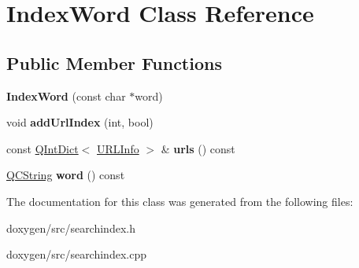 \hypertarget{class_index_word}{}\section{Index\+Word Class Reference}
\label{class_index_word}
\subsection*{Public Member Functions}
\begin{DoxyCompactItemize}
\item 
\mbox{\label{class_index_word_aebc5fc97bb87b053809703919508c765}} 
{\bfseries Index\+Word} (const char $\ast$word)
\item 
\mbox{\label{class_index_word_a16031b22d97aba33250595882a192b65}} 
void {\bfseries add\+Url\+Index} (int, bool)
\item 
\mbox{\label{class_index_word_a5643dbfdd1bffd26f5bb99ebb0019000}} 
const \mbox{\hyperlink{class_q_int_dict}{Q\+Int\+Dict}}$<$ \mbox{\hyperlink{struct_u_r_l_info}{U\+R\+L\+Info}} $>$ \& {\bfseries urls} () const
\item 
\mbox{\label{class_index_word_a54fb474095943edaf571b5083683d6a0}} 
\mbox{\hyperlink{class_q_c_string}{Q\+C\+String}} {\bfseries word} () const
\end{DoxyCompactItemize}


The documentation for this class was generated from the following files\+:\begin{DoxyCompactItemize}
\item 
doxygen/src/searchindex.\+h\item 
doxygen/src/searchindex.\+cpp\end{DoxyCompactItemize}

